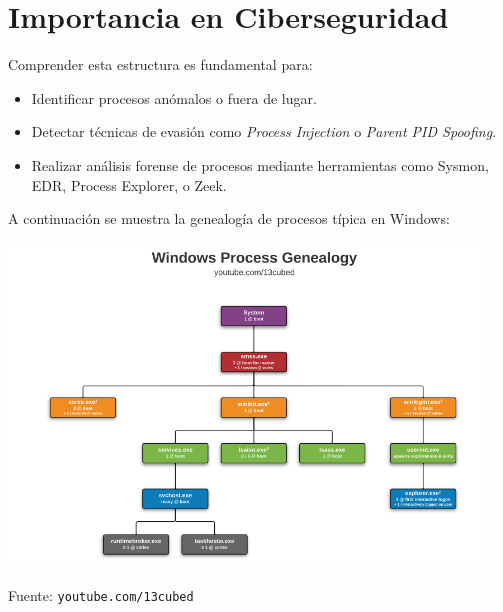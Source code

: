 \section*{Importancia en Ciberseguridad}

Comprender esta estructura es fundamental para:
\begin{itemize}
    \item Identificar procesos anómalos o fuera de lugar.
    \item Detectar técnicas de evasión como \textit{Process Injection} o
    \textit{Parent PID Spoofing}.
    \item Realizar análisis forense de procesos mediante herramientas como
    Sysmon, EDR, Process Explorer, o Zeek.
\end{itemize}

\vspace{1em}
\noindent A continuación se muestra la genealogía de procesos típica en
Windows:

\begin{center}
    \includegraphics[width=0.95\textwidth]{image.png}
\end{center}

\noindent Fuente: \texttt{youtube.com/13cubed}

